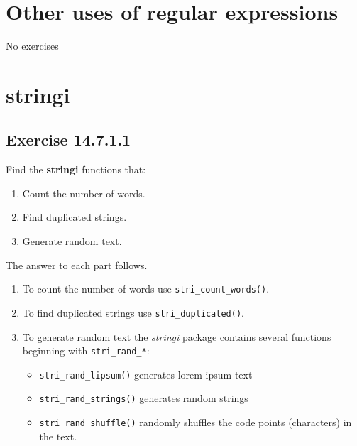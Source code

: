 \documentclass[]{book}
\providecommand{\tightlist}{%
  \setlength{\itemsep}{0pt}\setlength{\parskip}{0pt}}
\theoremstyle{plain}
\theoremstyle{remark}
\begin{document}
\hypertarget{other-uses-of-regular-expressions}{%
\section{Other uses of regular
expressions}\label{other-uses-of-regular-expressions}}

No exercises

\hypertarget{stringi}{%
\section{stringi}\label{stringi}}

\hypertarget{exercise-14.7.1.1}{%
\subsection*{\texorpdfstring{Exercise
{14.7.1.1}}{Exercise 14.7.1.1}}\label{exercise-14.7.1.1}}

Find the \textbf{stringi} functions that:

\begin{enumerate}
\def\labelenumi{\arabic{enumi}.}
\tightlist
\item
  Count the number of words.
\item
  Find duplicated strings.
\item
  Generate random text.
\end{enumerate}

The answer to each part follows.

\begin{enumerate}
\def\labelenumi{\arabic{enumi}.}
\item
  To count the number of words use \texttt{stri\_count\_words()}.
\item
  To find duplicated strings use \texttt{stri\_duplicated()}.
\item
  To generate random text the \emph{stringi} package contains several
  functions beginning with \texttt{stri\_rand\_*}:

  \begin{itemize}
  \tightlist
  \item
    \texttt{stri\_rand\_lipsum()} generates lorem ipsum text
  \item
    \texttt{stri\_rand\_strings()} generates random strings
  \item
    \texttt{stri\_rand\_shuffle()} randomly shuffles the code points
    (characters) in the text.
  \end{itemize}
\end{enumerate}
\end{document}
